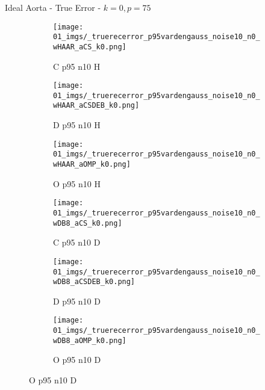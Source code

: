 \begin{frame}{Ideal Aorta - True Error - $k=0,p=75$}{}
\begin{figure}
\begin{subfigure}{0.13\textwidth}
\texttt{[image: 01\_imgs/\_truerecerror\_p95vardengauss\_noise10\_n0\_wHAAR\_aCS\_k0.png]}
\caption*{\tiny C p95 n10 H}
\end{subfigure}
\begin{subfigure}{0.13\textwidth}
\texttt{[image: 01\_imgs/\_truerecerror\_p95vardengauss\_noise10\_n0\_wHAAR\_aCSDEB\_k0.png]}
\caption*{\tiny D p95 n10 H}
\end{subfigure}
\begin{subfigure}{0.13\textwidth}
\texttt{[image: 01\_imgs/\_truerecerror\_p95vardengauss\_noise10\_n0\_wHAAR\_aOMP\_k0.png]}
\caption*{\tiny O p95 n10 H}
\end{subfigure}
\begin{subfigure}{0.13\textwidth}
\texttt{[image: 01\_imgs/\_truerecerror\_p95vardengauss\_noise10\_n0\_wDB8\_aCS\_k0.png]}
\caption*{\tiny C p95 n10 D}
\end{subfigure}
\begin{subfigure}{0.13\textwidth}
\texttt{[image: 01\_imgs/\_truerecerror\_p95vardengauss\_noise10\_n0\_wDB8\_aCSDEB\_k0.png]}
\caption*{\tiny D p95 n10 D}
\end{subfigure}
\begin{subfigure}{0.13\textwidth}
\texttt{[image: 01\_imgs/\_truerecerror\_p95vardengauss\_noise10\_n0\_wDB8\_aOMP\_k0.png]}
\caption*{\tiny O p95 n10 D}
\end{subfigure}

\vspace{5pt}


\end{figure}
\end{frame}
